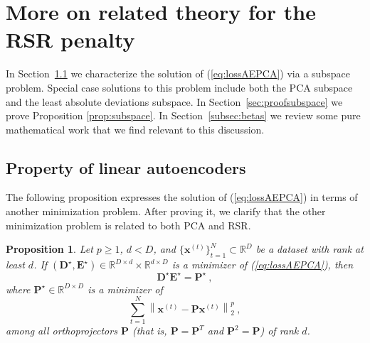 \documentclass{article} \usepackage{iclr2020_conference,times}
\def\Secref#1{Section~\ref{#1}}
\def\eqref#1{(\ref{#1})}
\def\rvx{{\mathbf{x}}}
\def\rmD{{\mathbf{D}}}
\def\rmE{{\mathbf{E}}}
\def\rmP{{\mathbf{P}}}
\newcommand{\R}{\mathbb{R}}
\newtheorem{proposition}{Proposition}[section]
\newcommand{\norm}[1]{\left\lVert#1\right\rVert}
\begin{document}
\section{More on related theory for the RSR penalty}
\label{sec:GAN}

In \Secref{subsec:linearaeforrsr} we characterize the solution of \eqref{eq:lossAEPCA} via a subspace problem. Special case solutions to this problem include both the PCA subspace and the least absolute deviations subspace.
In \Secref{sec:proofsubspace} we prove Proposition \ref{prop:subspace}. In \Secref{subsec:betas} we review some pure mathematical work that we find relevant to this discussion. 
\subsection{Property of linear autoencoders} \label{subsec:linearaeforrsr}
The following proposition expresses the solution of \eqref{eq:lossAEPCA} in terms of another minimization problem.
After proving it, we clarify that the other minimization problem is related to both PCA and RSR.

\begin{proposition}
\label{prop:deforpcarsr}
Let $p \geq 1$, $d<D$, and $\{\rvx^{(t)}\}_{t=1}^N \subset \R^D$ be a dataset with rank at least $d$. If $(\rmD^{\star}, \rmE^{\star}) \in \R^{D \times d} \times \R^{d \times D}$ is a minimizer of \eqref{eq:lossAEPCA}, then
\begin{equation}
\label{eq:deforpcarsr}
\rmD^{\star} \rmE^{\star} = \rmP^{\star} ~,
\end{equation}
where $\rmP^{\star} \in \R^{D \times D}$ is a minimizer of 
\begin{equation}
\label{eq:pstarargminxpx}
\sum_{t=1}^N \norm{\rvx^{(t)} - \rmP \rvx^{(t)}}_2^p ~,
\end{equation}
among all orthoprojectors $\rmP$ (that is, $\rmP = \rmP^T$ and $\rmP^2 = \rmP$) of rank $d$. 
\end{proposition}
\end{document}
